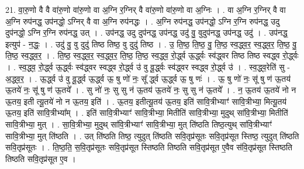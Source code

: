 \documentclass[17pt]{extarticle}
\begin{document}
21. वा॒रु॒णो वै वै वा॑रु॒णो वा॑रु॒णो वा अ॒ग्नि र॒ग्निर् वै वा॑रु॒णो वा॑रु॒णो वा अ॒ग्निः । . वा अ॒ग्नि र॒ग्निर् वै वा अ॒ग्नि रुप॑नद्ध॒ उप॑नद्धो॒ ऽग्निर् वै वा अ॒ग्नि रुप॑नद्धः । . अ॒ग्नि रुप॑नद्ध॒ उप॑नद्धो॒ ऽग्नि र॒ग्नि रुप॑नद्ध॒ उदु दुप॑नद्धो॒ ऽग्नि र॒ग्नि रुप॑नद्ध॒ उत् । . उप॑नद्ध॒ उदु दुप॑नद्ध॒ उप॑नद्ध॒ उदु॑ वु॒ वुदुप॑नद्ध॒ उप॑नद्ध॒ उदु॑ । . उप॑नद्ध॒ इत्युप॑ - न॒द्धः॒ । . उदु॑ वु॒ वु दुदु॑ तिष्ठ तिष्ठ॒ वु दुदु॑ तिष्ठ । . उ॒ ति॒ष्ठ॒ ति॒ष्ठ॒ वु॒ ति॒ष्ठ॒ स्व॒द्ध्व॒र॒ स्व॒द्ध्व॒र॒ ति॒ष्ठ॒ वु॒ ति॒ष्ठ॒ स्व॒द्ध्व॒र॒ । . ति॒ष्ठ॒ स्व॒द्ध्व॒र॒ स्व॒द्ध्व॒र॒ ति॒ष्ठ॒ ति॒ष्ठ॒ स्व॒द्ध्व॒ रो॒र्द्ध्व ऊ॒र्द्ध्वः स्व॑द्ध्वर तिष्ठ तिष्ठ स्वद्ध्व रो॒र्द्ध्वः । . स्व॒द्ध्व॒ रो॒र्द्ध्व ऊ॒र्द्ध्वः स्व॑द्ध्वर स्वद्ध्व रो॒र्द्ध्व उ॑ वु वू॒र्द्ध्वः स्व॑द्ध्वर स्वद्ध्व रो॒र्द्ध्व उ॑ । . स्व॒द्ध्व॒रेति॑ सु - अ॒द्ध्व॒र॒ । . ऊ॒र्द्ध्व उ॑ वु वू॒र्द्ध्व ऊ॒र्द्ध्व ऊ॒ षु णो॑ नः॒ सू᳚ र्द्ध्व ऊ॒र्द्ध्व ऊ॒ षु णः॑ । . ऊ॒ षु णो॑ नः॒ सू॑ षु ण॑ ऊ॒तय॑ ऊ॒तये॑ नः॒ सू॑ षु ण॑ ऊ॒तये᳚ । . सु नो॑ नः॒ सु सु न॑ ऊ॒तय॑ ऊ॒तये॑ नः॒ सु सु न॑ ऊ॒तये᳚ । . न॒ ऊ॒तय॑ ऊ॒तये॑ नो न ऊ॒तय॒ इती त्यू॒तये॑ नो न ऊ॒तय॒ इति॑ । . ऊ॒तय॒ इतीत्यू॒तय॑ ऊ॒तय॒ इति॑ सावि॒त्रीभ्याꣳ॑ सावि॒त्रीभ्या॒ मित्यू॒तय॑ ऊ॒तय॒ इति॑ सावि॒त्रीभ्या᳚म् । . इति॑ सावि॒त्रीभ्याꣳ॑ सावि॒त्रीभ्या॒ मितीति॑ सावि॒त्रीभ्या॒ मुदुथ् सा॑वि॒त्रीभ्या॒ मितीति॑ सावि॒त्रीभ्या॒ मुत् । . सा॒वि॒त्रीभ्या॒ मुदुथ् सा॑वि॒त्रीभ्याꣳ॑ सावि॒त्रीभ्या॒ मुत् ति॑ष्ठति तिष्ठ॒त्युथ् सा॑वि॒त्रीभ्याꣳ॑ सावि॒त्रीभ्या॒ मुत् ति॑ष्ठति । . उत् ति॑ष्ठति तिष्ठ॒ त्युदुत् ति॑ष्ठति सवि॒तृप्र॑सूतः सवि॒तृप्र॑सूत स्तिष्ठ॒ त्युदुत् ति॑ष्ठति सवि॒तृप्र॑सूतः । . ति॒ष्ठ॒ति॒ स॒वि॒तृप्र॑सूतः सवि॒तृप्र॑सूत स्तिष्ठति तिष्ठति सवि॒तृप्र॑सूत ए॒वैव स॑वि॒तृप्र॑सूत स्तिष्ठति तिष्ठति सवि॒तृप्र॑सूत ए॒व । \newline
\end{document}
